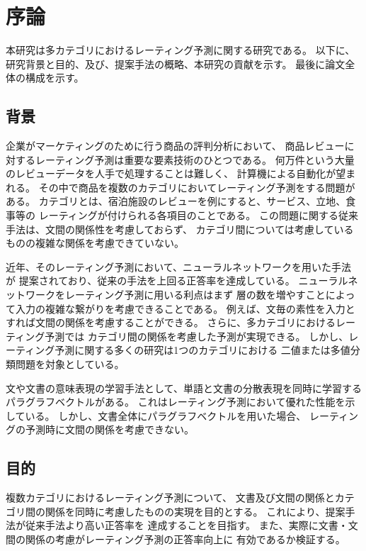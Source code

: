 \section{序論} \label{sec:Introduction}

本研究は多カテゴリにおけるレーティング予測に関する研究である。
以下に、研究背景と目的、及び、提案手法の概略、本研究の貢献を示す。
最後に論文全体の構成を示す。

\subsection{背景}

企業がマーケティングのために行う商品の評判分析において、
商品レビューに対するレーティング予測は重要な要素技術のひとつである。
何万件という大量のレビューデータを人手で処理することは難しく、
計算機による自動化が望まれる。
その中で商品を複数のカテゴリにおいてレーティング予測をする問題がある。
カテゴリとは、宿泊施設のレビューを例にすると、サービス、立地、食事等の
レーティングが付けられる各項目のことである。
この問題に関する従来手法\cite{fujitani15}は、文間の関係性を考慮しておらず、
カテゴリ間については考慮しているものの複雑な関係を考慮できていない。

近年、そのレーティング予測において、ニューラルネットワークを用いた手法
\cite{nal14,rie14,duyu15}が
提案されており、従来の手法を上回る正答率を達成している。
ニューラルネットワークをレーティング予測に用いる利点はまず
層の数を増やすことによって入力の複雑な繋がりを考慮できることである。
例えば、文毎の素性を入力とすれば文間の関係を考慮することができる。
さらに、多カテゴリにおけるレーティング予測では
カテゴリ間の関係を考慮した予測が実現できる。
しかし、レーティング予測に関する多くの研究は1つのカテゴリにおける
二値または多値分類問題を対象としている。

文や文書の意味表現の学習手法として、単語と文書の分散表現を同時に学習する
パラグラフベクトル\cite{quoc14}がある。
これはレーティング予測において優れた性能を示している。
しかし、文書全体にパラグラフベクトルを用いた場合、
レーティングの予測時に文間の関係を考慮できない。


\subsection{目的}

複数カテゴリにおけるレーティング予測について、
文書及び文間の関係とカテゴリ間の関係を同時に考慮したものの実現を目的とする。
これにより、提案手法が従来手法\cite{fujitani15}より高い正答率を
達成することを目指す。
また、実際に文書・文間の関係の考慮がレーティング予測の正答率向上に
有効であるか検証する。



